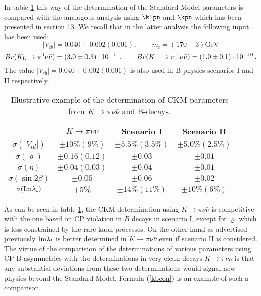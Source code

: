 In table \ref{tabkb} this way of the determination of
the Standard Model parameters is compared with the analogous analysis
using $\klpn$ and $\kpn$ which has been presented in section 13. We
recall that in the latter analysis
the following input has been used:
\begin{equation}\label{vcbmt}
|V_{cb}|=0.040\pm 0.002(0.001)\,, \qquad m_t=(170\pm 3) \mbox{GeV}
\end{equation}
\begin{equation}\label{bklkp}
Br(K_{\rm L}\to\pi^0\nu\bar\nu)=(3.0\pm 0.3)\cdot 10^{-11}\,,\qquad
Br(K^+\to\pi^+\nu\bar\nu)=(1.0\pm 0.1)\cdot 10^{-10}\,.
\end{equation}
The value  $|V_{cb}|=0.040\pm 0.002(0.001)$ is also used in B physics
scenarios I and II respectively.

\begin{table}
\caption[]{Illustrative example of the determination of CKM
parameters from $K\to\pi\nu\bar\nu$ and B-decays.
\label{tabkb}}
\vspace{0.4cm}
\begin{center}
\begin{tabular}{|c||c||c|c|}\hline
&$K\to\pi\nu\bar\nu$ 
& {\rm Scenario I} & {\rm Scenario II}
\\ 
\hline
\hline
$\sigma(|V_{td}|) $& $\pm 10\% (9\% )$
& $\pm 5.5\% (3.5\%)$ & $\pm 5.0\% (2.5\%)$\\ 
\hline 
$\sigma(\bar\varrho) $ & $\pm 0.16 (0.12)$
& $\pm 0.03$  & $\pm 0.01$\\
\hline
$\sigma(\bar\eta)$ & $\pm 0.04(0.03)$
&$\pm 0.04 $ & $\pm 0.01 $\\
\hline
$\sigma(\sin 2\beta)$ & $\pm 0.05$
& $\pm 0.06 $ & $\pm 0.02$\\
\hline
$\sigma({\rm Im}\lambda_t)$&$\pm 5\%$ 
& $\pm 14\%(11\%)$ & $\pm 10\%(6\%)$\\
\hline
\end{tabular}
\end{center}
\end{table}
As can be seen in table \ref{tabkb}, the CKM determination
using $K\to\pi\nu\bar\nu$ is competitive with the one based
on CP violation in $B$ decays in scenario I, except for $\bar\varrho$ which
is less constrained by the rare kaon processes.
On the other hand as advertised previously ${\rm Im}\lambda_t$ 
is better determined
in $K\to\pi\nu\bar\nu$ even if scenario II is considered.
The virtue of the comparision of the determinations
of various parameters using CP-B asymmetries with the determinations
in very clean decays $K\to\pi\nu\bar\nu$ is that any substantial deviations
from these two determinations would signal new physics beyond the
Standard Model.
 Formula (\ref{kbcon}) is an example of such a comparison.

